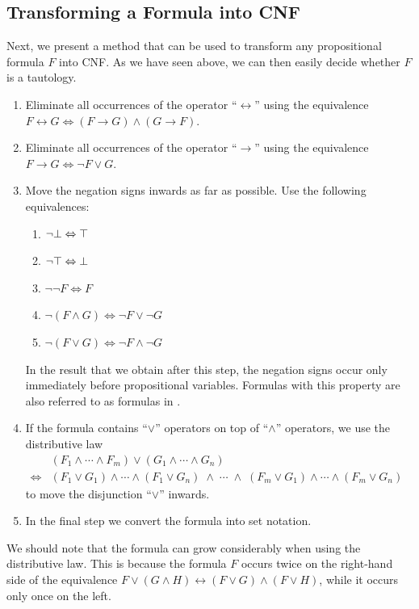 \subsection{Transforming a Formula into CNF}
Next, we present a method that can be used to transform any propositional formula $F$ into CNF.  As we have
seen above, we can then easily decide whether $F$ is a tautology. 
\begin{enumerate}
\item Eliminate all occurrences of the operator ``$\leftrightarrow$'' using the equivalence \\[0.2cm]
      \hspace*{1.3cm} 
      $F \leftrightarrow G \Leftrightarrow (F \rightarrow G) \wedge (G \rightarrow F)$.
\item Eliminate all occurrences of the operator ``$\rightarrow$'' using the equivalence \\[0.2cm]
      \hspace*{1.3cm} 
      $F \rightarrow G \Leftrightarrow \neg F \vee G$.
\item Move the negation signs inwards as far as possible.  Use the following equivalences:
      \begin{enumerate}
      \item $\neg \bot \Leftrightarrow \top$
      \item $\neg \top \Leftrightarrow \bot$
      \item $\neg \neg F \Leftrightarrow F$
      \item $\neg (F \wedge G) \Leftrightarrow \neg F \vee \neg G$ 
      \item $\neg (F \vee G) \Leftrightarrow \neg F \wedge \neg G$ 
      \end{enumerate}
      In the result that we obtain after this step, the negation signs
      occur only immediately before propositional variables.  Formulas with this
      property are also referred to as formulas in .
\item If the formula contains ``$\vee$'' operators on top of ``$\wedge$'' operators, we use the distributive law \\[0.2cm]
      \hspace*{1.3cm} 
      $
      \begin{array}{cl}
                      & (F_1 \wedge \cdots \wedge F_m) \vee (G_1 \wedge \cdots \wedge G_n) \\[0.2cm]
      \Leftrightarrow & (F_1 \vee G_1) \wedge \cdots \wedge (F_1 \vee G_n) \;\wedge \;\cdots\; \wedge\;
                        (F_m \vee G_1) \wedge \cdots \wedge (F_m \vee G_n)
      \end{array}
      $
      \\[0.2cm]
      to move the disjunction ``$\vee$'' inwards.
\item In the final step we convert the formula into set notation.
\end{enumerate}
We should note that the formula can grow considerably when using the distributive law.
This is because the formula $F$ occurs twice on the right-hand side of the equivalence 
$F \vee (G \wedge H) \leftrightarrow (F \vee G) \wedge (F \vee H)$, while it occurs only once on the left. 

